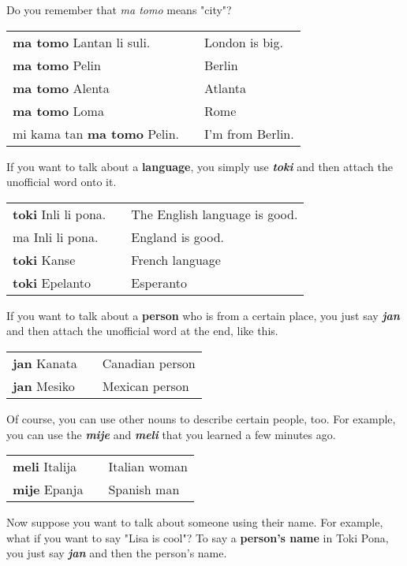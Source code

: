 Do you remember that \textit{ma tomo} means "city"? 

\begin{supertabular}{p{5,5cm}|ll}
\textbf{ma tomo} Lantan li suli. && London is big. \\
\textbf{ma tomo} Pelin && Berlin \\
\textbf{ma tomo} Alenta && Atlanta \\
\textbf{ma tomo} Loma && Rome \\
mi kama tan \textbf{ma tomo} Pelin. && I'm from Berlin. \\
\end{supertabular} 

If you want to talk about a \textbf{language}, you simply use \textbf{\textit{toki}} and then attach the unofficial word onto it. 

\begin{supertabular}{p{5,5cm}|ll}
\textbf{toki} Inli li pona. && The English language is good. \\
ma Inli li pona. && England is good. \\
\textbf{toki} Kanse && French language \\
\textbf{toki} Epelanto && Esperanto \\
\end{supertabular} 

If you want to talk about a \textbf{person} who is from a certain place, you just say \textbf{\textit{jan}} and then attach the unofficial word at the end, like this. 

\begin{supertabular}{p{5,5cm}|ll}
\textbf{jan} Kanata && Canadian person \\
\textbf{jan} Mesiko && Mexican person \\
\end{supertabular} 

Of course, you can use other nouns to describe certain people, too. 
For example, you can use the \textbf{\textit{mije}} and \textbf{\textit{meli}} that you learned a few minutes ago. 

\begin{supertabular}{p{5,5cm}|ll}
\textbf{meli} Italija && Italian woman \\
\textbf{mije} Epanja && Spanish man \\
\end{supertabular} 

Now suppose you want to talk about someone using their name. 
For example, what if you want to say "Lisa is cool"? 
To say a \textbf{person's name} in Toki Pona, you just say \textbf{\textit{jan}} and then the person's name. 

